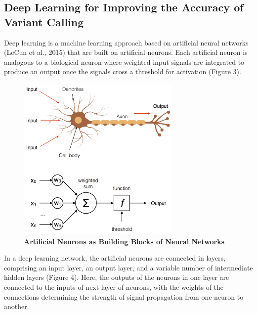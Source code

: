 \documentclass{article}
\begin{document}
\subsection{Deep Learning for Improving the Accuracy of Variant Calling} 
Deep learning is a machine learning approach based on artificial neural networks (LeCun et al., 2015) that are built on artificial neurons. Each artificial neuron is analogous to a biological neuron where weighted input signals are integrated to produce an output once the signals cross a threshold for activation (Figure 3).  
\begin{figure}[H]
\includegraphics[width=0.7\textwidth]{neuron.png}
\centering
\caption{\textbf{Artificial Neurons as Building Blocks of Neural Networks}}
\end{figure}
In a deep learning network, the artificial neurons are connected in layers, comprising an input layer, an output layer, and a variable number of intermediate hidden layers (Figure 4). Here, the outputs of the neurons in one layer are connected to the inputs of next layer of neurons, with the weights of the connections determining the strength of signal propagation from one neuron to another.
\end{document}
